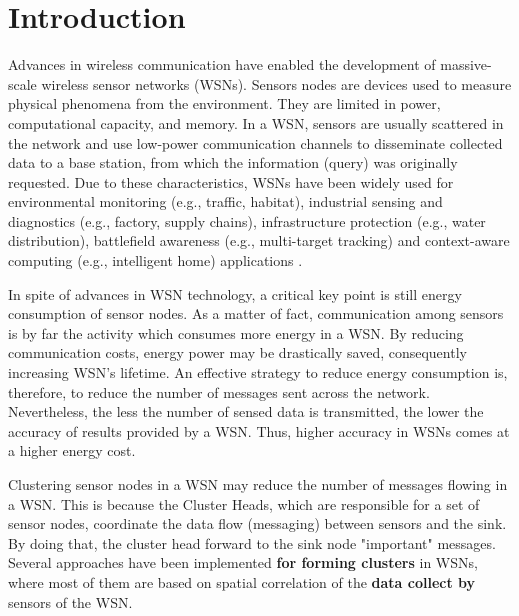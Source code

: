 \documentclass{acm_proc_article-sp}
\begin{document}





\section{Introduction}

Advances in wireless communication have enabled the development of massive-scale
wireless sensor networks (WSNs). Sensors nodes are devices used to measure
physical phenomena from the environment. They are limited in power,
computational capacity, and memory. In a WSN, sensors are usually scattered in
the network and use low-power communication channels to disseminate collected
data to a base station, from which the information (query) was originally
requested. Due to these characteristics, WSNs have been widely used for
environmental monitoring (e.g., traffic, habitat), industrial sensing and
diagnostics (e.g., factory, supply chains), infrastructure protection (e.g.,
water distribution), battlefield awareness (e.g., multi-target tracking) and
context-aware computing (e.g., intelligent home) applications
\cite{MaiaSAC2013}.
\vspace*{-.3cm}

In spite of advances in WSN technology, a critical key point is still energy
consumption of sensor nodes. As a matter of fact, communication among sensors is
by far the activity which consumes more energy in a WSN. By reducing
communication costs, energy power may be drastically saved, consequently
increasing WSN's lifetime. An effective strategy to reduce energy consumption
is, therefore, to reduce the number of messages sent across the network.
Nevertheless, the less the number of sensed data is transmitted, the lower the
accuracy of results provided by a WSN. Thus, higher accuracy in WSNs comes at a
higher energy cost.
\vspace*{-.3cm}

Clustering sensor nodes in a WSN may reduce the number of messages flowing in a
WSN. This is because the Cluster Heads, which are responsible for a set of
sensor nodes, coordinate the data flow (messaging) between sensors and the sink.
By doing that, the cluster head forward to the sink node "important" messages.
Several approaches have been implemented \textbf{for forming clusters} in WSNs,
where most of them are based on spatial correlation of the \textbf{data collect by}
sensors of the WSN.
\vspace*{-.3cm}
\end{document}
